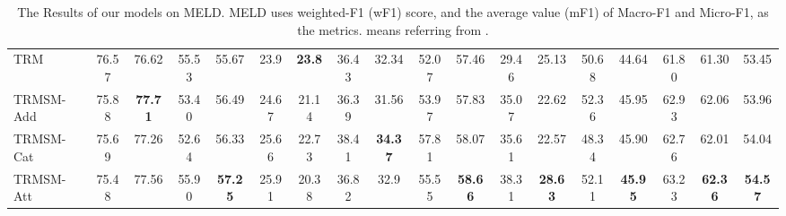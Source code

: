 \documentclass[letterpaper]{article} \usepackage{aaai21}  \usepackage{times}  \usepackage{helvet} \usepackage{courier}  \usepackage[hyphens]{url}  \usepackage{graphicx} \urlstyle{rm} \def\UrlFont{\rm}  \usepackage{natbib}  \usepackage{caption} \usepackage{multirow}
\begin{document}
\begin{table*}
{\begin{tabular}{@{}l|ccccccccccccccccc@{}}
TRM                      & 76.57                     & \multicolumn{1}{c|}{76.62}          & 55.53                     & \multicolumn{1}{c|}{55.67}          & 23.9                      & \multicolumn{1}{c|}{\textbf{23.8}}           & 36.43                     & \multicolumn{1}{c|}{32.34}          & 52.07                     & \multicolumn{1}{c|}{57.46}          & 29.46                     & \multicolumn{1}{c|}{25.13}          & 50.68                     & \multicolumn{1}{c|}{44.64}          & 61.80                 & 61.30                     & 53.45          \\
TRMSM-Add                & 75.88                     & \multicolumn{1}{c|}{\textbf{77.71}}          & 53.40                     & \multicolumn{1}{c|}{56.49}          & 24.67                     & \multicolumn{1}{c|}{21.14}          & 36.39                     & \multicolumn{1}{c|}{31.56} & 53.97                     & \multicolumn{1}{c|}{57.83}          & 35.07                     & \multicolumn{1}{c|}{22.62}          & 52.36                     & \multicolumn{1}{c|}{45.95}          & 62.93                 & 62.06                     & 53.96          \\
TRMSM-Cat                & 75.69                     & \multicolumn{1}{c|}{77.26}          & 52.64                     & \multicolumn{1}{c|}{56.33}          & 25.66                     & \multicolumn{1}{c|}{22.73}          & 38.41                     & \multicolumn{1}{c|}{\textbf{34.37}}          & 57.81                     & \multicolumn{1}{c|}{58.07}          & 35.61                     & \multicolumn{1}{c|}{22.57}          & 48.34                     & \multicolumn{1}{c|}{45.90}          & 62.76                 & 62.01                     & 54.04          \\
TRMSM-Att                & 75.48                     & \multicolumn{1}{c|}{77.56} & 55.90                     & \multicolumn{1}{c|}{\textbf{57.25}} & 25.91                     & \multicolumn{1}{c|}{20.38} & 36.82                     & \multicolumn{1}{c|}{32.9}          & 55.55                     & \multicolumn{1}{c|}{\textbf{58.66}} & 38.31                     & \multicolumn{1}{c|}{\textbf{28.63}}          & 52.11                     & \multicolumn{1}{c|}{\textbf{45.95}} & 63.23                 & \textbf{62.36}            & \textbf{54.57} \\ \bottomrule
\end{tabular}
}
\caption{The Results of our models on MELD. MELD uses weighted-F1 (wF1) score, and the average value (mF1) of Macro-F1 and Micro-F1, as the metrics.  means referring from \citet{AGHMN}. }
\label{tab: meld}
\end{table*}
\end{document}
